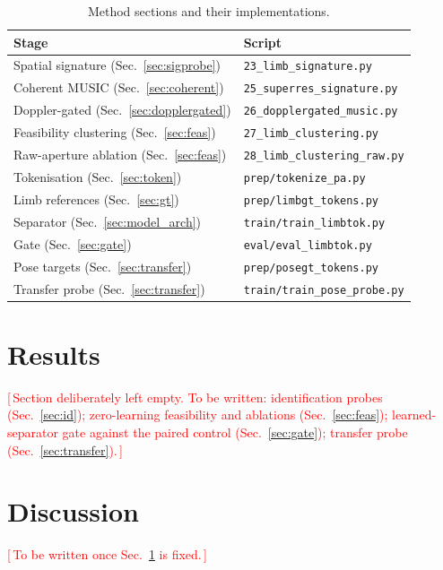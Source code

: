 \documentclass[conference]{IEEEtran}
\newcommand{\resultslot}[1]{\textcolor{red}{[\,#1\,]}}
\begin{document}
\begin{table}[t]
\caption{Method sections and their implementations.}
\label{tab:scripts}
\centering
\small
\begin{tabular}{@{}ll@{}}
\toprule
Stage & Script \\
\midrule
Spatial signature (Sec.~\ref{sec:sigprobe}) & \texttt{23\_limb\_signature.py} \\
Coherent MUSIC (Sec.~\ref{sec:coherent}) & \texttt{25\_superres\_signature.py} \\
Doppler-gated (Sec.~\ref{sec:dopplergated}) & \texttt{26\_dopplergated\_music.py} \\
Feasibility clustering (Sec.~\ref{sec:feas}) & \texttt{27\_limb\_clustering.py} \\
Raw-aperture ablation (Sec.~\ref{sec:feas}) & \texttt{28\_limb\_clustering\_raw.py} \\
Tokenisation (Sec.~\ref{sec:token}) & \texttt{prep/tokenize\_pa.py} \\
Limb references (Sec.~\ref{sec:gt}) & \texttt{prep/limbgt\_tokens.py} \\
Separator (Sec.~\ref{sec:model_arch}) & \texttt{train/train\_limbtok.py} \\
Gate (Sec.~\ref{sec:gate}) & \texttt{eval/eval\_limbtok.py} \\
Pose targets (Sec.~\ref{sec:transfer}) & \texttt{prep/posegt\_tokens.py} \\
Transfer probe (Sec.~\ref{sec:transfer}) & \texttt{train/train\_pose\_probe.py} \\
\bottomrule
\end{tabular}
\end{table}

\section{Results}
\label{sec:results}

\resultslot{Section deliberately left empty. To be written: identification
probes (Sec.~\ref{sec:id}); zero-learning feasibility and ablations
(Sec.~\ref{sec:feas}); learned-separator gate against the paired control
(Sec.~\ref{sec:gate}); transfer probe (Sec.~\ref{sec:transfer}).}

\section{Discussion}
\label{sec:discussion}

\resultslot{To be written once Sec.~\ref{sec:results} is fixed.}
\end{document}
